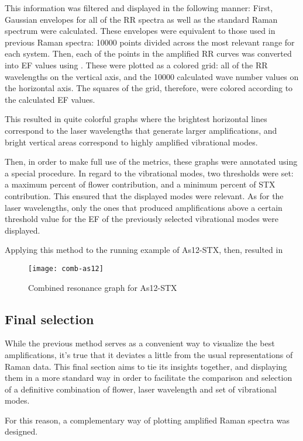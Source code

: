 This information was filtered and displayed in the following manner:
First, Gaussian envelopes for all of the RR spectra as well as the standard Raman spectrum were calculated.
These envelopes were equivalent to those used in previous Raman spectra: 10000 points divided across the most relevant range for each system.
Then, each of the points in the amplified RR curves was converted into EF values using .
These were plotted as a colored grid: all of the RR wavelengths on the vertical axis, and the 10000 calculated wave number values on the horizontal axis.
The squares of the grid, therefore, were colored according to the calculated EF values.

This resulted in quite colorful graphs where the brightest horizontal lines correspond to the laser wavelengths that generate larger amplifications, and bright vertical areas correspond to highly amplified vibrational modes.

Then, in order to make full use of the metrics, these graphs were annotated using a special procedure.
In regard to the vibrational modes, two thresholds were set: a maximum percent of flower contribution, and a minimum percent of STX contribution.
This ensured that the displayed modes were relevant.
As for the laser wavelengths, only the ones that produced amplifications above a certain threshold value for the EF of the previously selected vibrational modes were displayed.

Applying this method to the running example of As12-STX, then, resulted in 

\begin{figure}
    \texttt{[image: comb-as12]}
    \caption[Combined resonance graph for As12-STX]{Combined resonance graph for As12-STX}
\end{figure}



\subsection{Final selection}
While the previous method serves as a convenient way to visualize the best amplifications, it's true that it deviates a little from the usual representations of Raman data.
This final section aims to tie its insights together, and displaying them in a more standard way in order to facilitate the comparison and selection of a definitive combination of flower, laser wavelength and set of vibrational modes.

For this reason, a complementary way of plotting amplified Raman spectra was designed.
